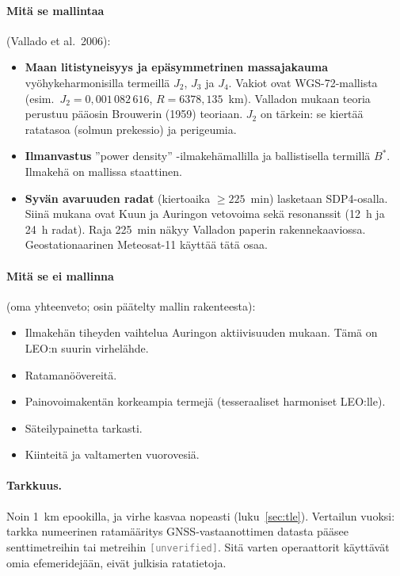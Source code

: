 \documentclass[a4paper,11pt]{article}
\newcommand{\unverified}[1][]{\textcolor{gray}{\texttt{[unverified#1]}}}
\begin{document}
\paragraph{Mitä se mallintaa} (Vallado et al.\ 2006):
\begin{itemize}
  \item \textbf{Maan litistyneisyys ja epäsymmetrinen massajakauma} vyöhykeharmonisilla termeillä $J_2$, $J_3$ ja $J_4$. Vakiot ovat WGS-72-mallista (esim.\ $J_2 = 0{,}001\,082\,616$, $R = 6378{,}135$~km). Valladon mukaan teoria perustuu pääosin Brouwerin (1959) teoriaan. $J_2$ on tärkein: se kiertää ratatasoa (solmun prekessio) ja perigeumia.
  \item \textbf{Ilmanvastus} ”power density” -ilmakehämallilla ja ballistisella termillä $B^*$. Ilmakehä on mallissa staattinen.
  \item \textbf{Syvän avaruuden radat} (kiertoaika $\geq 225$~min) lasketaan SDP4-osalla. Siinä mukana ovat Kuun ja Auringon vetovoima sekä resonanssit (12~h ja 24~h radat). Raja 225~min näkyy Valladon paperin rakennekaaviossa. Geostationaarinen Meteosat-11 käyttää tätä osaa.
\end{itemize}

\paragraph{Mitä se ei mallinna} (oma yhteenveto; osin päätelty mallin rakenteesta):
\begin{itemize}
  \item Ilmakehän tiheyden vaihtelua Auringon aktiivisuuden mukaan. Tämä on LEO:n suurin virhelähde.
  \item Ratamanöövereitä.
  \item Painovoimakentän korkeampia termejä (tesseraaliset harmoniset LEO:lle).
  \item Säteilypainetta tarkasti.
  \item Kiinteitä ja valtamerten vuorovesiä.
\end{itemize}

\paragraph{Tarkkuus.} Noin 1~km epookilla, ja virhe kasvaa nopeasti (luku~\ref{sec:tle}). Vertailun vuoksi: tarkka numeerinen ratamääritys GNSS-vastaanottimen datasta pääsee senttimetreihin tai metreihin \unverified. Sitä varten operaattorit käyttävät omia efemeridejään, eivät julkisia ratatietoja.
\end{document}
